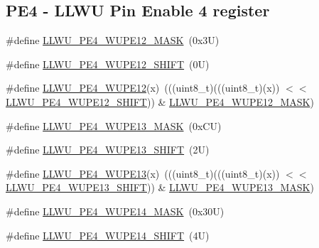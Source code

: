\subsection*{P\+E4 -\/ L\+L\+WU Pin Enable 4 register}
\begin{DoxyCompactItemize}
\item 
\#define \mbox{\hyperlink{group___l_l_w_u___register___masks_ga0d1b6351b58cc9fbf3099dc653754205}{L\+L\+W\+U\+\_\+\+P\+E4\+\_\+\+W\+U\+P\+E12\+\_\+\+M\+A\+SK}}~(0x3\+U)
\item 
\#define \mbox{\hyperlink{group___l_l_w_u___register___masks_gaddb0a17347a85705dc2c2975129a7942}{L\+L\+W\+U\+\_\+\+P\+E4\+\_\+\+W\+U\+P\+E12\+\_\+\+S\+H\+I\+FT}}~(0\+U)
\item 
\#define \mbox{\hyperlink{group___l_l_w_u___register___masks_ga433532e85a0db075b0e525c1483a27ad}{L\+L\+W\+U\+\_\+\+P\+E4\+\_\+\+W\+U\+P\+E12}}(x)~(((uint8\+\_\+t)(((uint8\+\_\+t)(x)) $<$$<$ \mbox{\hyperlink{group___l_l_w_u___register___masks_gaddb0a17347a85705dc2c2975129a7942}{L\+L\+W\+U\+\_\+\+P\+E4\+\_\+\+W\+U\+P\+E12\+\_\+\+S\+H\+I\+FT}})) \& \mbox{\hyperlink{group___l_l_w_u___register___masks_ga0d1b6351b58cc9fbf3099dc653754205}{L\+L\+W\+U\+\_\+\+P\+E4\+\_\+\+W\+U\+P\+E12\+\_\+\+M\+A\+SK}})
\item 
\#define \mbox{\hyperlink{group___l_l_w_u___register___masks_ga4d9218c37bd27ed586a5e73aa1b20a84}{L\+L\+W\+U\+\_\+\+P\+E4\+\_\+\+W\+U\+P\+E13\+\_\+\+M\+A\+SK}}~(0x\+C\+U)
\item 
\#define \mbox{\hyperlink{group___l_l_w_u___register___masks_ga176680468b0cf75fbccc4a8be5d45388}{L\+L\+W\+U\+\_\+\+P\+E4\+\_\+\+W\+U\+P\+E13\+\_\+\+S\+H\+I\+FT}}~(2\+U)
\item 
\#define \mbox{\hyperlink{group___l_l_w_u___register___masks_ga0f97d1fbb1fd4c3be4a4641755e8b7a9}{L\+L\+W\+U\+\_\+\+P\+E4\+\_\+\+W\+U\+P\+E13}}(x)~(((uint8\+\_\+t)(((uint8\+\_\+t)(x)) $<$$<$ \mbox{\hyperlink{group___l_l_w_u___register___masks_ga176680468b0cf75fbccc4a8be5d45388}{L\+L\+W\+U\+\_\+\+P\+E4\+\_\+\+W\+U\+P\+E13\+\_\+\+S\+H\+I\+FT}})) \& \mbox{\hyperlink{group___l_l_w_u___register___masks_ga4d9218c37bd27ed586a5e73aa1b20a84}{L\+L\+W\+U\+\_\+\+P\+E4\+\_\+\+W\+U\+P\+E13\+\_\+\+M\+A\+SK}})
\item 
\#define \mbox{\hyperlink{group___l_l_w_u___register___masks_gae3a1e7b7497f719cfebd559f31dc4d07}{L\+L\+W\+U\+\_\+\+P\+E4\+\_\+\+W\+U\+P\+E14\+\_\+\+M\+A\+SK}}~(0x30\+U)
\item 
\#define \mbox{\hyperlink{group___l_l_w_u___register___masks_ga1942d07f99eb5afb836650dcfb2185af}{L\+L\+W\+U\+\_\+\+P\+E4\+\_\+\+W\+U\+P\+E14\+\_\+\+S\+H\+I\+FT}}~(4\+U)

\end{DoxyCompactItemize}
